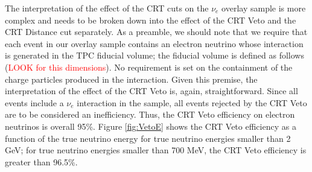 The interpretation of the effect of the CRT cuts on the $\nu_e$ overlay sample is more complex and needs to be broken down into the effect of the CRT Veto and the CRT Distance cut separately.  
As a preamble, we should note that we require that each event in our overlay sample contains an electron neutrino whose interaction is generated in the TPC fiducial volume;  the fiducial volume is defined as follows (\textcolor{red}{LOOK for this dimensions}). No requirement is set on the containment of the charge particles produced in the interaction. Given this premise, the interpretation of the effect of the CRT Veto is, again, straightforward. Since all events include a $\nu_e$ interaction in the sample, all events rejected by the CRT Veto are to be considered an inefficiency.  Thus, the CRT Veto efficiency on electron neutrinos is overall 95\%. Figure \ref{fig:VetoE} shows the CRT Veto efficiency as a function of the true neutrino energy for true neutrino energies smaller than 2 GeV;  for true neutrino energies smaller than 700 MeV, the CRT Veto efficiency is greater than 96.5\%. 

